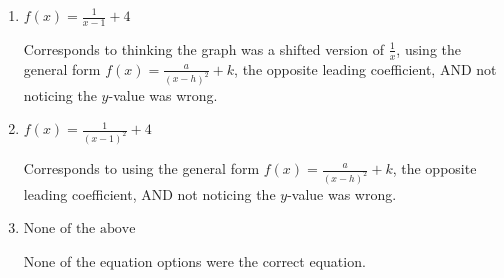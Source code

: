 \documentclass{extbook}[14pt]
\begin{document}
\begin{enumerate}
{\begin{enumerate}[label=\Alph*.]
The $x$- and $y$-value of the equation does not match the graph.
\item \( f(x) = \frac{1}{x - 1} + 4 \)

Corresponds to thinking the graph was a shifted version of $\frac{1}{x}$, using the general form $f(x) = \frac{a}{(x-h)^2}+k$, the opposite leading coefficient, AND not noticing the $y$-value was wrong.
\item \( f(x) = \frac{1}{(x - 1)^2} + 4 \)

Corresponds to using the general form $f(x) = \frac{a}{(x-h)^2}+k$, the opposite leading coefficient, AND not noticing the $y$-value was wrong.
\item \( \text{None of the above} \)

None of the equation options were the correct equation.
\end{enumerate}

}
\end{enumerate}
\end{document}
